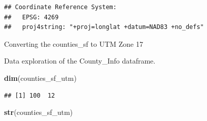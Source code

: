 \documentclass[12pt,]{article}
\newenvironment{Shaded}{\begin{snugshade}}{\end{snugshade}}
\newcommand{\KeywordTok}[1]{\textcolor[rgb]{0.13,0.29,0.53}{\textbf{#1}}}
\newcommand{\DataTypeTok}[1]{\textcolor[rgb]{0.13,0.29,0.53}{#1}}
\newcommand{\DecValTok}[1]{\textcolor[rgb]{0.00,0.00,0.81}{#1}}
\newcommand{\StringTok}[1]{\textcolor[rgb]{0.31,0.60,0.02}{#1}}
\newcommand{\CommentTok}[1]{\textcolor[rgb]{0.56,0.35,0.01}{\textit{#1}}}
\newcommand{\OperatorTok}[1]{\textcolor[rgb]{0.81,0.36,0.00}{\textbf{#1}}}
\newcommand{\NormalTok}[1]{#1}
\begin{document}
\begin{verbatim}
## Coordinate Reference System:
##   EPSG: 4269 
##   proj4string: "+proj=longlat +datum=NAD83 +no_defs"
\end{verbatim}

Converting the counties\_sf to UTM Zone 17

\begin{Shaded}
\end{Shaded}

Data exploration of the County\_Info dataframe.

\begin{Shaded}
\begin{Highlighting}[]
\KeywordTok{dim}\NormalTok{(counties_sf_utm)}
\end{Highlighting}
\end{Shaded}

\begin{verbatim}
## [1] 100  12
\end{verbatim}

\begin{Shaded}
\begin{Highlighting}[]
\KeywordTok{str}\NormalTok{(counties_sf_utm)}
\end{Highlighting}
\end{Shaded}
\end{document}
